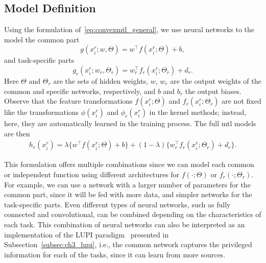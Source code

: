 \subsection{Model Definition}
Using the formulation of~\eqref{eq:convexmtl_general}, we use neural networks to the model the common part 
$$ g(x_i^r; w, \Theta) = w^\intercal f(x_i^r; \Theta) + b,$$
and task-specific parts
$$ g_r(x_i^r; w_r, \Theta_r) =  w_r^\intercal f_r(x_i^r; \Theta_r) + d_r.$$
Here $\Theta$ and $\Theta_r$ are the sets of hidden weights, $w$, $w_r$ are the output weights of the common and specific networks, respectively, and $b$ and $b_r$ the output biases.
Observe that the feature transformations $ f(x_i^r; \Theta)$ and $f_r(x_i^r; \Theta_r)$ are not fixed like the transformations $\phi(x_i^r)$ and $\phi_r(x_i^r)$ in the kernel methods; instead, here, they are automatically learned in the training process.
The full \acrshort{mtl} models are then
\begin{equation}
    \label{eq:convexmtl_nn}
    \begin{aligned}
        h_r(x_i^r)
       = \lambda \lbrace w^\intercal f(x_i^r; \Theta) + b \rbrace + (1 - \lambda) \lbrace w_r^\intercal f_r(x_i^r; \Theta_r) + d_r \rbrace.
    \end{aligned}    
\end{equation}

This formulation offers multiple combinations since we can model each common or independent function using different architectures for $f(\cdot; \Theta)$ or $f_r(\cdot; \Theta_r)$.
%
For example, we can use a network with a larger number of parameters for the common part, since it will be fed with more data, and simpler networks for the task-specific parts.
%
Even different types of neural networks, such as fully connected and convolutional, can be combined depending on the characteristics of each task.
This combination of neural networks can also be interpreted as an implementation of the LUPI paradigm~\citep{VapnikI15a} presented in Subsection~\ref{subsec:ch3_lupi}, i.e., the common network captures the privileged information for each of the tasks, since it can learn from more sources.
%

%
